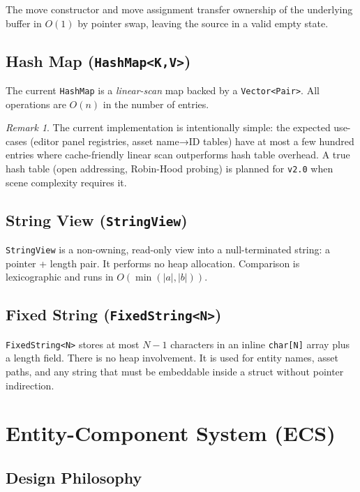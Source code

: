 \documentclass[12pt, a4paper]{report}
\theoremstyle{definition}
\theoremstyle{remark}
\newtheorem{remark}{Remark}[section]
\begin{document}
The move constructor and move assignment transfer ownership of the
underlying buffer in $O(1)$ by pointer swap, leaving the source in
a valid empty state.

\section{Hash Map (\texttt{HashMap<K,V>})}

The current \texttt{HashMap} is a \emph{linear-scan} map backed by a
\texttt{Vector<Pair>}. All operations are $O(n)$ in the number of entries.

\begin{remark}
The current implementation is intentionally simple: the expected
use-cases (editor panel registries, asset name→ID tables) have at
most a few hundred entries where cache-friendly linear scan outperforms
hash table overhead. A true hash table (open addressing, Robin-Hood
probing) is planned for \texttt{v2.0} when scene complexity requires it.
\end{remark}

\section{String View (\texttt{StringView})}

\texttt{StringView} is a non-owning, read-only view into a null-terminated
string: a pointer + length pair. It performs no heap allocation. Comparison
is lexicographic and runs in $O(\min(|a|, |b|))$.

\section{Fixed String (\texttt{FixedString<N>})}

\texttt{FixedString<N>} stores at most $N-1$ characters in an inline
\texttt{char[N]} array plus a length field. There is no heap involvement.
It is used for entity names, asset paths, and any string that must be
embeddable inside a struct without pointer indirection.

\chapter{Entity-Component System (ECS)}

\section{Design Philosophy}
\end{document}
